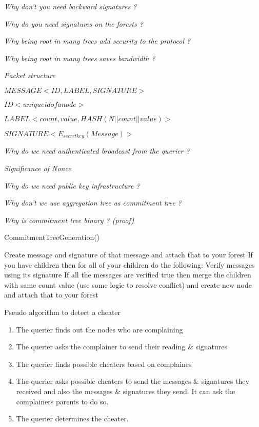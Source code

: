 \textit{Why don't you need backward signatures ?}

\textit{Why do you need signatures on the forests ?}

\textit{Why being root in many trees add security to the protocol ?}

\textit{Why being root in many trees saves bandwidth ?}

\textit{Packet structure}

	$MESSAGE <ID, LABEL, SIGNATURE>$

	$ID <unique id of a node>$

	$LABEL <count, value, HASH(N||count||value)>$

	$SIGNATURE <E_{secretkey}(Message)>$

\textit{Why do we need authenticated broadcast from the querier ?}

\textit{Significance of Nonce}

\textit{Why do we need public key infrastructure ?}

\textit{Why don't we use aggregation tree as commitment tree ?}

\textit{Why is commitment tree binary ? (proof)}

\begin{algorithm}[H]
\caption {CommitmentTreeGeneration()}\label{number3}
	\begin {algorithmic}[1]
			\STATE Create message and signature of that message and attach that to your forest
			\STATE If you have children then for all of your children do the following:
			\STATE Verify messages using its signature 
			\STATE If all the messages are verified true then merge the children with same count value (use some logic to resolve conflict) and create new node and attach that to your forest
		\ENDFOR
	\end{algorithmic}
\end{algorithm}

\begin{algorithm}
\caption{Pseudo algorithm to detect a cheater}
	\begin{enumerate}
		\item The querier finds out the nodes who are complaining 
		\item The querier asks the complainer to send their reading \& signatures
		\item The querier finds possible cheaters based on complaines
		\item The querier asks possible cheaters to send the messages \& signatures they received and also the messages \& signatures they send. It can ask the complainers parents to do so.
		\item The querier determines the cheater. 
	\end{enumerate}

\end{algorithm}
